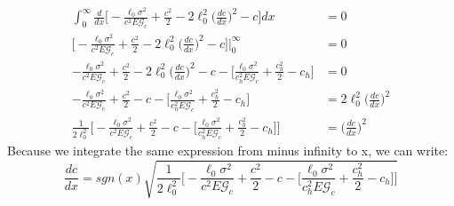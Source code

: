\documentclass[12pt,3p]{article}
\numberwithin{equation}{section}
\begin{document}
\begin{align*}
\int_{0}^{\infty} \frac{d}{dx} \bigg[ - \frac{\ell_0 \sigma^2}{c^2 E \mathcal{G}_c} + \frac{c^2}{2} - 2 \ell_0^2 \bigg( \frac{dc }{d x} \bigg)^2 -  c  \bigg] dx &= 0 \\
\bigg[ - \frac{\ell_0 \sigma^2}{c^2 E \mathcal{G}_c} + \frac{c^2}{2} - 2 \ell_0^2 \bigg( \frac{dc }{d x} \bigg)^2 -  c  \bigg] \bigg\rvert_{0}^{\infty} &= 0 \\
- \frac{\ell_0 \sigma^2}{c^2 E \mathcal{G}_c} + \frac{c^2}{2} - 2 \ell_0^2 \bigg( \frac{dc }{d x} \bigg)^2 -  c  - \bigg[ \frac{\ell_0 \sigma^2}{c_h^2 E \mathcal{G}_c} + \frac{c_h^2}{2} -  c_h \bigg] &= 0  \\
- \frac{\ell_0 \sigma^2}{c^2 E \mathcal{G}_c} + \frac{c^2}{2}  -  c  - \bigg[ \frac{\ell_0 \sigma^2}{c_h^2 E \mathcal{G}_c} + \frac{c_h^2}{2} -  c_h \bigg] &= 2 \ell_0^2 \bigg( \frac{dc }{d x} \bigg)^2 \\
\frac{1}{2 \ell_0^2} \bigg[ - \frac{\ell_0 \sigma^2}{c^2 E \mathcal{G}_c} + \frac{c^2}{2}  -  c  - \bigg[ \frac{\ell_0 \sigma^2}{c_h^2 E \mathcal{G}_c} + \frac{c_h^2}{2} -  c_h \bigg] \bigg] &= \bigg( \frac{dc }{d x} \bigg)^2 
\end{align*}
Because we integrate the same expression from minus infinity to x, we can write:
\begin{equation}
\frac{dc}{dx} = sgn(x) \sqrt{\frac{1}{2 \ell_0^2} \bigg[ - \frac{\ell_0 \sigma^2}{c^2 E \mathcal{G}_c} + \frac{c^2}{2}  -  c  - \bigg[ \frac{\ell_0 \sigma^2}{c_h^2 E \mathcal{G}_c} + \frac{c_h^2}{2} -  c_h \bigg] \bigg]}
\end{equation}
\end{document}
